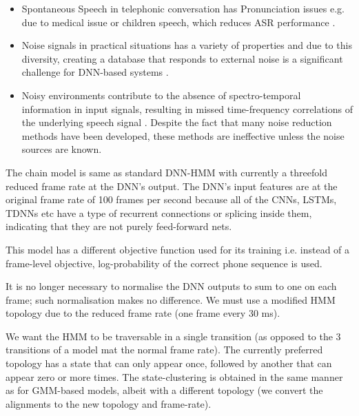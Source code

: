 \begin{itemize}
    \item Spontaneous Speech in telephonic conversation has Pronunciation issues e.g. due to medical issue or children speech, which reduces ASR performance \cite{kumar_leveraging_2020}.
    \item Noise signals in practical situations has a variety of properties\cite{lee_threshold-based_2018} and due to this diversity, creating a database that responds to external noise is a significant challenge for DNN-based systems \cite{gosztolya_domain_2016}.
    \item Noisy environments contribute to the absence of spectro-temporal information in input signals, resulting in missed time-frequency correlations of the underlying speech signal \cite{ganapathy_multivariate_2017}. Despite the fact that many noise reduction methods have been developed, these methods are ineffective unless the noise sources are known.
\end{itemize}



The chain model is same as standard DNN-HMM with currently a threefold reduced frame rate at the DNN's output. The DNN's input features are at the original frame rate of 100 frames per second because all of the CNNs, LSTMs, TDNNs etc have a type of recurrent connections or splicing inside them, indicating that they are not purely feed-forward nets.


This model has a different objective function used for its training i.e. instead of a frame-level objective, log-probability of the correct phone sequence is used. 


It is no longer necessary to normalise the DNN outputs to sum to one on each frame; such normalisation makes no difference. We must use a modified HMM topology due to the reduced frame rate (one frame every 30 ms). 

We want the HMM to be traversable in a single transition (as opposed to the 3 transitions of a model mat the normal frame rate). The currently preferred topology has a state that can only appear once, followed by another that can appear zero or more times. The state-clustering is obtained in the same manner as for GMM-based models, albeit with a different topology (we convert the alignments to the new topology and frame-rate).


